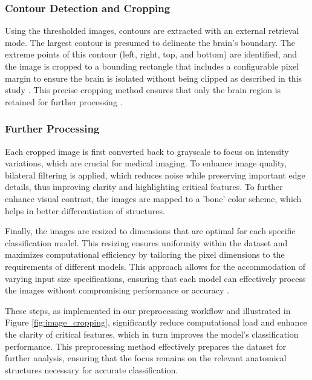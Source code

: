 \subsubsection{Contour Detection and Cropping}

Using the thresholded images, contours are extracted with an external retrieval mode. The largest contour is presumed to delineate the brain's boundary. The extreme points of this contour (left, right, top, and bottom) are identified, and the image is cropped to a bounding rectangle that includes a configurable pixel margin to ensure the brain is isolated without being clipped as described in this study \cite{10.3389/fnhum.2023.1150120}. This precise cropping method ensures that only the brain region is retained for further processing \cite{Vimala_Srinivasan_Mathivanan_Mahalakshmi_Jayagopal_Dalu_2023}.

\subsubsection{Further Processing}

Each cropped image is first converted back to grayscale to focus on intensity variations, which are crucial for medical imaging. To enhance image quality, bilateral filtering is applied, which reduces noise while preserving important edge details, thus improving clarity and highlighting critical features. To further enhance visual contrast, the images are mapped to a 'bone' color scheme, which helps in better differentiation of structures.

Finally, the images are resized to dimensions that are optimal for each specific classification model. This resizing ensures uniformity within the dataset and maximizes computational efficiency by tailoring the pixel dimensions to the requirements of different models. This approach allows for the accommodation of varying input size specifications, ensuring that each model can effectively process the images without compromising performance or accuracy \cite{9926057}.

These steps, as implemented in our preprocessing workflow and illustrated in Figure \ref{fig:image_cropping}, significantly reduce computational load and enhance the clarity of critical features, which in turn improves the model's classification performance. This preprocessing method effectively prepares the dataset for further analysis, ensuring that the focus remains on the relevant anatomical structures necessary for accurate classification.

